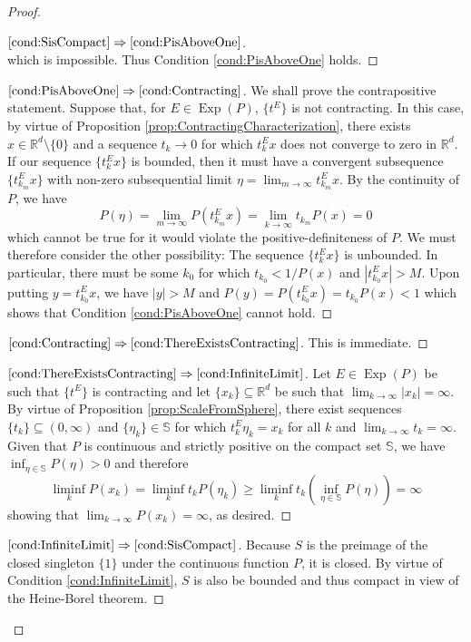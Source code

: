 \documentclass[11pt]{article}
\newcommand*{\myproofname}{Proof}
\newenvironment{subproof}[1][\myproofname]{\begin{proof}[#1]\renewcommand*{\qedsymbol}{$\mathbin{/\mkern-6mu/}$}}{\end{proof}}
\newcommand\Exp{\operatorname{Exp}}
\begin{document}
\begin{proof}
\begin{subproof}[$\ref{cond:SisCompact}\Rightarrow\ref{cond:PisAboveOne}$]
\begin{equation*}
\end{equation*}
which is impossible. Thus Condition \ref{cond:PisAboveOne} holds.
\end{subproof}
\begin{subproof}[$\ref{cond:PisAboveOne}\Rightarrow\ref{cond:Contracting}$]
We shall prove the contrapositive statement. Suppose that, for $E\in\Exp(P)$, $\{t^E\}$ is not contracting. In this case, by virtue of Proposition \ref{prop:ContractingCharacterization}, there exists $x\in\mathbb{R}^d\setminus\{0\}$ and a sequence $t_k\to 0$ for which $t_k^Ex$ does not converge to zero in $\mathbb{R}^d$. If our sequence $\{t_k^Ex\}$ is bounded, then it must have a convergent subsequence $\{t_{k_m}^Ex\}$ with non-zero subsequential limit $\eta=\lim_{m\to\infty}t_{k_m}^Ex$. By the continuity of $P$, we have
\begin{equation*}
P(\eta)=\lim_{m\to\infty}P(t_{k_m}^Ex)=\lim_{k\to\infty}t_{k_m}P(x)=0
\end{equation*}
which cannot be true for it would violate the positive-definiteness of $P$. We must therefore consider the other possibility: The sequence $\{t_k^Ex\}$ is unbounded. In particular, there must be some $k_0$ for which $t_{k_0}<1/P(x)$ and $|t_{k_0}^Ex|>M$. Upon putting $y=t_{k_0}^Ex$, we have $|y|>M$ and  $P(y)=P(t_{k_0}^Ex)=t_{k_0}P(x)<1$ which shows that Condition \ref{cond:PisAboveOne} cannot hold.
\end{subproof}
\begin{subproof}[$\ref{cond:Contracting}\Rightarrow\ref{cond:ThereExistsContracting}$] This is immediate.
\end{subproof}
\begin{subproof}[$\ref{cond:ThereExistsContracting}\Rightarrow\ref{cond:InfiniteLimit}$]
Let $E\in\Exp(P)$ be such that $\{t^E\}$ is contracting and let $\{x_k\}\subseteq\mathbb{R}^d$ be such that $\lim_{k\to\infty}|x_k|=\infty$. By virtue of Proposition \ref{prop:ScaleFromSphere}, there exist sequences $\{t_k\}\subseteq (0,\infty)$ and $\{\eta_k\}\in\mathbb{S}$ for which $t_k^E\eta_k=x_k$ for all $k$ and $\lim_{k\to\infty}t_k=\infty$. Given that $P$ is continuous and strictly positive on the compact set $\mathbb{S}$, we have $\inf_{\eta\in\mathbb{S}}P(\eta)>0$ and therefore
\begin{equation*}
\liminf_k P(x_k)=\liminf_k t_kP(\eta_k)\geq \liminf_k t_k\left(\inf_{\eta\in\mathbb{S}}P(\eta)\right)=\infty
\end{equation*}
showing that $\lim_{k\to\infty} P(x_k)=\infty$, as desired.
\end{subproof}
\begin{subproof}[$\ref{cond:InfiniteLimit}\Rightarrow\ref{cond:SisCompact}$]
Because $S$ is the preimage of the closed singleton $\{1\}$ under the continuous function $P$, it is closed. By virtue of Condition \ref{cond:InfiniteLimit}, $S$ is also be bounded and thus compact in view of the Heine-Borel theorem.
\end{subproof}
\end{proof}
\end{document}
